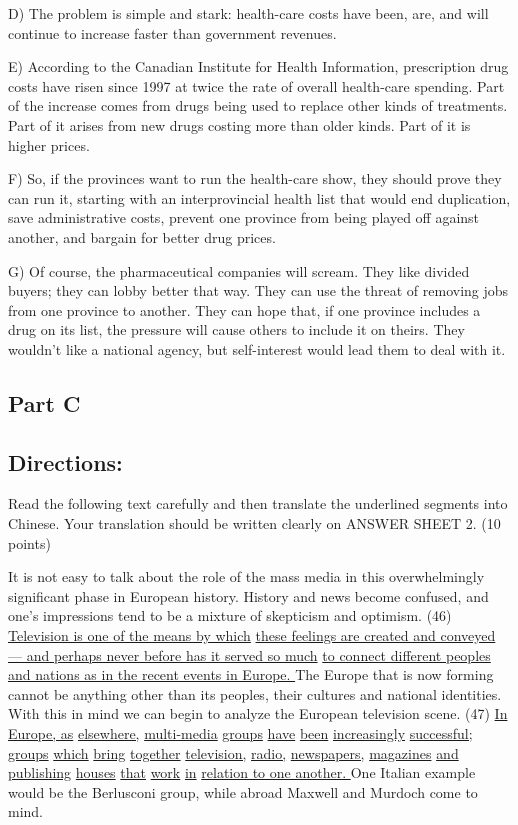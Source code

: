 \documentclass[UTF8,11pt]{ctexart}
\begin{document}
D) The problem is simple and stark: health-care costs have been, are, and will continue to increase faster than government revenues.


E) According to the Canadian Institute for Health Information, prescription drug costs have risen since 1997 at twice the rate of overall health-care spending. Part of the increase comes from drugs being used to replace other kinds of treatments. Part of it arises from new drugs costing more than older kinds. Part of it is higher prices.


F) So, if the provinces want to run the health-care show, they should prove they can run it, starting with an interprovincial health list that would end duplication, save administrative costs, prevent one province from being played off against another, and bargain for better drug prices.


G) Of course, the pharmaceutical companies will scream. They like divided buyers; they can lobby better that way. They can use the threat of removing jobs from one province to another. They can hope that, if one province includes a drug on its list, the pressure will cause others to include it on theirs. They wouldn’t like a national agency, but self-interest would lead them to deal with it.


\subsection*{\textbf{Part C}}


\subsection*{\textbf{Directions:}}


Read the following text carefully and then translate the underlined segments into Chinese. Your translation should be written clearly on ANSWER SHEET 2. (10 points)


It is not easy to talk about the role of the mass media in this overwhelmingly significant phase in European history. History and news become confused, and one’s impressions tend to be a mixture of skepticism and optimism. (46) \uline{Television is one of the means by which} \uline{these feelings are created and conveyed — and perhaps never before has it served so much} \uline{to connect different peoples and nations as in the recent events in Europe. }The Europe that is now forming cannot be anything other than its peoples, their cultures and national identities. With this in mind we can begin to analyze the European television scene. (47) \uline{In Europe, as} \uline{elsewhere,} \uline{multi-media} \uline{groups} \uline{have} \uline{been} \uline{increasingly} \uline{successful;} \uline{groups} \uline{which} \uline{bring} \uline{together} \uline{television,} \uline{radio,} \uline{newspapers,} \uline{magazines} \uline{and} \uline{publishing} \uline{houses} \uline{that} \uline{work} \uline{in} \uline{relation to one another. }One Italian example would be the Berlusconi group, while abroad Maxwell and Murdoch come to mind.
\end{document}
